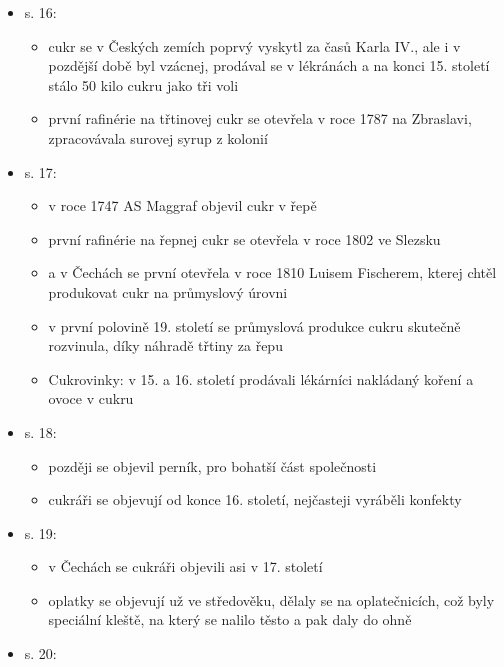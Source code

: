 \begin{itemize}
\begin{itemize}
    \begin{itemize}
    \tightlist
    \item
      s. 16:

      \begin{itemize}
      \tightlist
      \item
        cukr se v Českých zemích poprvý vyskytl za časů Karla IV., ale i
        v pozdější době byl vzácnej, prodával se v lékránách a na konci
        15. století stálo 50 kilo cukru jako tři voli
      \item
        první rafinérie na třtinovej cukr se otevřela v roce 1787 na
        Zbraslavi, zpracovávala surovej syrup z kolonií
      \end{itemize}
    \item
      s. 17:

      \begin{itemize}
      \tightlist
      \item
        v roce 1747 AS Maggraf objevil cukr v řepě
      \item
        první rafinérie na řepnej cukr se otevřela v roce 1802 ve
        Slezsku
      \item
        a v Čechách se první otevřela v roce 1810 Luisem Fischerem,
        kterej chtěl produkovat cukr na průmyslový úrovni
      \item
        v první polovině 19. století se průmyslová produkce cukru
        skutečně rozvinula, díky náhradě třtiny za řepu
      \item
        Cukrovinky: v 15. a 16. století prodávali lékárníci nakládaný
        koření a ovoce v cukru
      \end{itemize}
    \item
      s. 18:

      \begin{itemize}
      \tightlist
      \item
        později se objevil perník, pro bohatší část společnosti
      \item
        cukráři se objevují od konce 16. století, nejčasteji vyráběli
        konfekty
      \end{itemize}
    \item
      s. 19:

      \begin{itemize}
      \tightlist
      \item
        v Čechách se cukráři objevili asi v 17. století
      \item
        oplatky se objevují už ve středověku, dělaly se na
        oplatečnicích, což byly speciální kleště, na který se nalilo
        těsto a pak daly do ohně
      \end{itemize}
    \item
      s. 20:


\end{itemize}
\end{itemize}
\end{itemize}
